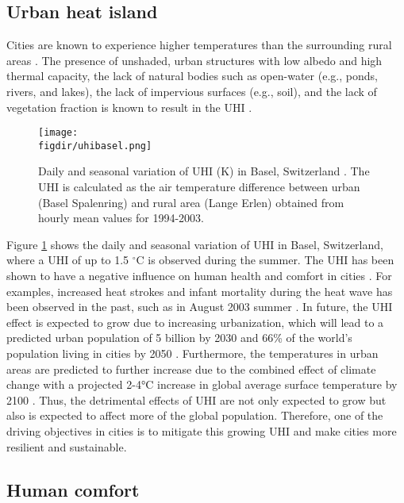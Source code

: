 \subsection{Urban heat island}

Cities are known to experience higher temperatures than the surrounding rural areas \citep{Oke1973,Oke2017a}. The presence of unshaded, urban structures with low albedo and high thermal capacity, the lack of natural bodies such as open-water (e.g., ponds, rivers, and lakes), the lack of impervious surfaces (e.g., soil), and the lack of vegetation fraction is known to result in the UHI \citep{Bowler2010}. 
	
	\begin{figure}[t]
		\centering
		\texttt{[image: \\figdir/uhibasel.png]}
		\caption{Daily and seasonal variation of UHI (K) in Basel, Switzerland \citep{Parlow2014}. The UHI is calculated as the air temperature difference between urban (Basel Spalenring) and rural area (Lange Erlen) obtained from hourly mean values for 1994-2003.}
		\label{fig:uhibasel}
	\end{figure}

Figure \ref{fig:uhibasel} shows the daily and seasonal variation of UHI in Basel, Switzerland, where a UHI of up to 1.5 $^{\circ}$C is observed during the summer. The UHI has been shown to have a negative influence on human health and comfort in cities \citep{santamouris2001energy,Kovats2008,Salmond2016}. For examples, increased heat strokes and infant mortality during the heat wave has been observed in the past, such as in August 2003 summer \citep{Fouillet2006}. In future, the UHI effect is expected to grow due to increasing urbanization, which will lead to a predicted urban population of 5 billion by 2030 and 66\% of the world’s population living in cities by 2050 \citep{Seto2012, UnitedNations2015}. Furthermore, the temperatures in urban areas are predicted to further increase due to the combined effect of climate change with a projected 2-4\si{\celsius} increase in global average surface temperature by 2100 \citep{pachauri2014climate}. Thus, the detrimental effects of UHI are not only expected to grow but also is expected to affect more of the global population. Therefore, one of the driving objectives in cities is to mitigate this growing UHI and make cities more resilient and sustainable. 

\subsection{Human comfort}


